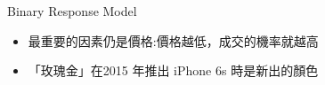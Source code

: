 \documentclass[11pt]{beamer}
\begin{document}
\begin{frame}[fragile]{Binary Response Model}

\begin{itemize}
	\item 最重要的因素仍是價格:價格越低，成交的機率就越高
	\item 「玫瑰金」在2015 年推出 iPhone 6s 時是新出的顏色
\end{itemize}

\end{frame}
\end{document}

